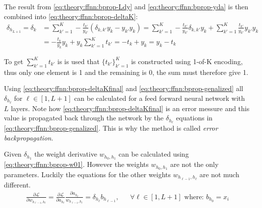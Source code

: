 The result from \eqref{eq:theory:ffnn:bprop-Ldy} and \eqref{eq:theory:ffnn:bprop-yda} is then combined into \eqref{eq:theory:ffnn:bprop-deltaK}:
\begin{equation}
\begin{aligned}
\delta_{h_{L + 1}} = \delta_k &= \sum_{k'=1}^K -\frac{t_{k'}}{y_{k'}} \left( \delta_{k, k'} y_k - y_{k'} y_k \right) = \sum_{k'=1}^K -\frac{t_{k'}}{y_{k'}} \delta_{k, k'} y_k + \sum_{k'=1}^K \frac{t_{k'}}{y_{k'}} y_{k'} y_k \\
&= -\frac{t_k}{y_k} y_k + y_k \sum_{k'=1}^K t_{k'} = -t_k + y_k = y_k - t_k
\end{aligned}
\label{eq:theory:ffnn:bprop-deltaKfinal}
\end{equation}

To get $\sum_{k'=1}^K t_{k'}$ is is used that $\{ t_{k'} \}_{k'=1}^K$ is constructed using 1-of-K encoding, thus only one element is 1 and the remaining is 0, the sum must therefore give 1.

Using \eqref{eq:theory:ffnn:bprop-deltaKfinal} and \eqref{eq:theory:ffnn:bprop-genalized} all $\delta_{h_\ell}$ for $\ell \in [1, L+1]$ can be calculated for a feed forward neural network with $L$ layers. Note how \eqref{eq:theory:ffnn:bprop-deltaKfinal} is an error messure and this value is propagated back through the network by the $\delta_{h_\ell}$ equations in \eqref{eq:theory:ffnn:bprop-genalized}. This is why the method is called \textit{error backpropagation}.

Given $\delta_{h_1}$ the weight derivative $w_{h_0, h_1}$ can be calculated using \eqref{eq:theory:ffnn:bprop-w01}. However the weights $w_{h_0, h_1}$ are not the only parameters. Luckily the equations for the other weights $w_{h_{\ell-1}, h_\ell}$ are not much different.
\begin{equation}
\begin{aligned}
\frac{\partial \mathcal{L}}{\partial w_{h_{\ell-1}, h_\ell}} = \frac{\partial \mathcal{L}}{\partial a_{h_\ell}}
\frac{\partial a_{h_\ell}}{w_{h_{\ell-1}, h_\ell}} = \delta_{h_\ell} b_{h_{\ell-1}}, && \forall \ell \in [1, L+1] \text{ where: } b_{h_0} = x_i
\end{aligned}
\end{equation}

